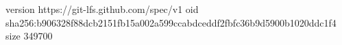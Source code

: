 version https://git-lfs.github.com/spec/v1
oid sha256:b906328f88dcb2151fb15a002a599ccabdceddf2fbfc36b9d5900b1020ddc1f4
size 349700

